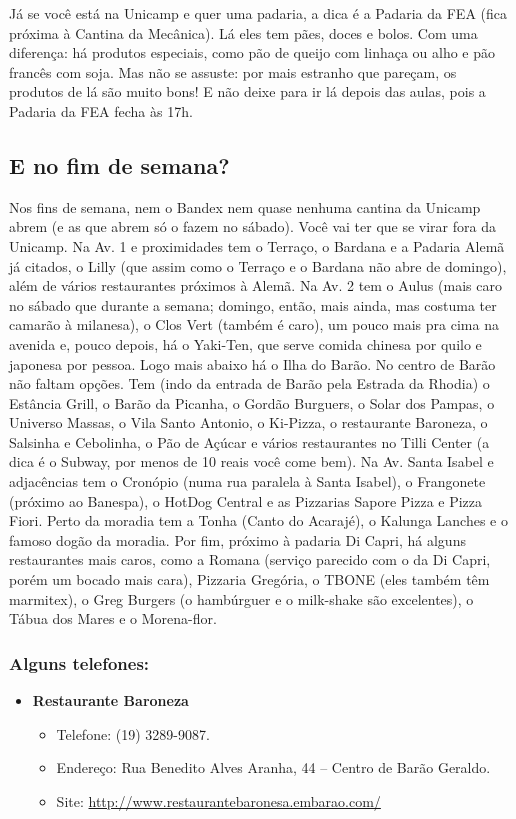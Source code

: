 \documentclass[a4paper,10pt]{article}
\begin{document}
Já se você está na Unicamp e quer uma padaria, a dica é a Padaria da FEA (fica
próxima à Cantina da Mecânica). Lá eles tem pães, doces e bolos. Com uma
diferença: há produtos especiais, como pão de queijo com linhaça ou alho e pão
francês com soja. Mas não se assuste: por mais estranho que pareçam, os produtos
de lá são muito bons! E não deixe para ir lá depois das aulas, pois a Padaria da
FEA fecha às 17h. 

\subsection{E no fim de semana?}
Nos fins de semana, nem o Bandex nem quase nenhuma cantina da Unicamp abrem (e
as que abrem só o fazem no sábado). Você vai ter que se virar fora da Unicamp.
Na Av. 1 e proximidades tem o Terraço, o Bardana e a Padaria Alemã já citados,
o Lilly (que assim como o Terraço e o Bardana não abre de domingo), além de
vários restaurantes próximos à Alemã. Na Av. 2 tem o Aulus (mais caro no sábado
que durante a semana; domingo, então, mais ainda, mas costuma ter camarão
à milanesa), o Clos Vert (também é caro), um pouco mais pra cima na avenida e,
pouco depois, há o Yaki-Ten, que serve comida chinesa por quilo e japonesa por
pessoa. Logo mais abaixo há o Ilha do Barão. No centro de Barão não faltam
opções. Tem (indo da entrada de Barão pela Estrada da Rhodia) o Estância Grill,
o Barão da Picanha, o Gordão Burguers, o Solar dos Pampas, o Universo Massas,
o Vila Santo Antonio, o Ki-Pizza, o restaurante Baroneza, o Salsinha
e Cebolinha, o Pão de Açúcar e vários restaurantes no Tilli Center (a dica
é o Subway, por menos de 10 reais você come bem). Na Av. Santa Isabel
e adjacências tem o Cronópio (numa rua paralela à Santa Isabel), o Frangonete
(próximo ao Banespa), o HotDog Central e as Pizzarias Sapore Pizza e Pizza
Fiori. Perto da moradia tem a Tonha (Canto do Acarajé), o Kalunga Lanches
e o famoso dogão da moradia. Por fim, próximo à padaria Di Capri, há alguns
restaurantes mais caros, como a Romana (serviço parecido com o da Di Capri,
porém um bocado mais cara), Pizzaria Gregória, o TBONE (eles também têm
marmitex), o Greg Burgers (o hambúrguer e o milk-shake são excelentes), o Tábua
dos Mares e o Morena-flor. 

\subsubsection{Alguns telefones:}
\begin{itemize}
\item  \textbf{Restaurante Baroneza}
\begin{itemize}
\item  Telefone: (19) 3289-9087.
\item  Endereço: Rua Benedito Alves Aranha, 44 -- Centro de Barão Geraldo.
\item  Site: \url{http://www.restaurantebaronesa.embarao.com/}
\end{itemize}
\end{itemize}
\end{document}

